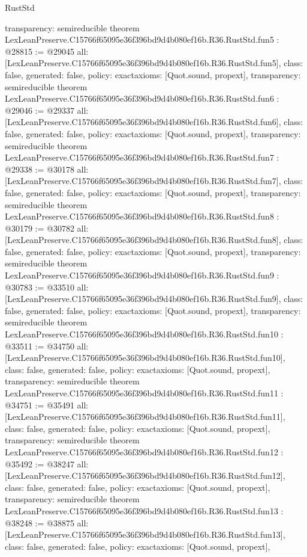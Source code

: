 \begin{lexlean}{RustStd}
\begin{coremodule}
{  transparency: semireducible
}
theorem LexLeanPreserve.C15766f65095e36f396bd9d4b080ef16b.R36.RustStd.fun5 : @28815 := @29045 {
  all: [LexLeanPreserve.C15766f65095e36f396bd9d4b080ef16b.R36.RustStd.fun5],
  class: false,
  generated: false,
  policy: exact{axioms: [Quot.sound, propext]},
  transparency: semireducible
}
theorem LexLeanPreserve.C15766f65095e36f396bd9d4b080ef16b.R36.RustStd.fun6 : @29046 := @29337 {
  all: [LexLeanPreserve.C15766f65095e36f396bd9d4b080ef16b.R36.RustStd.fun6],
  class: false,
  generated: false,
  policy: exact{axioms: [Quot.sound, propext]},
  transparency: semireducible
}
theorem LexLeanPreserve.C15766f65095e36f396bd9d4b080ef16b.R36.RustStd.fun7 : @29338 := @30178 {
  all: [LexLeanPreserve.C15766f65095e36f396bd9d4b080ef16b.R36.RustStd.fun7],
  class: false,
  generated: false,
  policy: exact{axioms: [Quot.sound, propext]},
  transparency: semireducible
}
theorem LexLeanPreserve.C15766f65095e36f396bd9d4b080ef16b.R36.RustStd.fun8 : @30179 := @30782 {
  all: [LexLeanPreserve.C15766f65095e36f396bd9d4b080ef16b.R36.RustStd.fun8],
  class: false,
  generated: false,
  policy: exact{axioms: [Quot.sound, propext]},
  transparency: semireducible
}
theorem LexLeanPreserve.C15766f65095e36f396bd9d4b080ef16b.R36.RustStd.fun9 : @30783 := @33510 {
  all: [LexLeanPreserve.C15766f65095e36f396bd9d4b080ef16b.R36.RustStd.fun9],
  class: false,
  generated: false,
  policy: exact{axioms: [Quot.sound, propext]},
  transparency: semireducible
}
theorem LexLeanPreserve.C15766f65095e36f396bd9d4b080ef16b.R36.RustStd.fun10 : @33511 := @34750 {
  all: [LexLeanPreserve.C15766f65095e36f396bd9d4b080ef16b.R36.RustStd.fun10],
  class: false,
  generated: false,
  policy: exact{axioms: [Quot.sound, propext]},
  transparency: semireducible
}
theorem LexLeanPreserve.C15766f65095e36f396bd9d4b080ef16b.R36.RustStd.fun11 : @34751 := @35491 {
  all: [LexLeanPreserve.C15766f65095e36f396bd9d4b080ef16b.R36.RustStd.fun11],
  class: false,
  generated: false,
  policy: exact{axioms: [Quot.sound, propext]},
  transparency: semireducible
}
theorem LexLeanPreserve.C15766f65095e36f396bd9d4b080ef16b.R36.RustStd.fun12 : @35492 := @38247 {
  all: [LexLeanPreserve.C15766f65095e36f396bd9d4b080ef16b.R36.RustStd.fun12],
  class: false,
  generated: false,
  policy: exact{axioms: [Quot.sound, propext]},
  transparency: semireducible
}
theorem LexLeanPreserve.C15766f65095e36f396bd9d4b080ef16b.R36.RustStd.fun13 : @38248 := @38875 {
  all: [LexLeanPreserve.C15766f65095e36f396bd9d4b080ef16b.R36.RustStd.fun13],
  class: false,
  generated: false,
  policy: exact{axioms: [Quot.sound, propext]},
}
\end{coremodule}
\end{lexlean}
